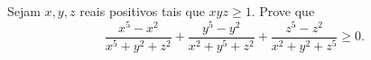 Sejam $x,y,z$ reais positivos tais que $xyz\geq 1$. Prove que \[ \frac { x^5-x^2 }{x^5+y^2+z^2} + \frac {y^5-y^2}{x^2+y^5+z^2} + \frac {z^5-z^2}{x^2+y^2+z^5} \geq 0 . \]
